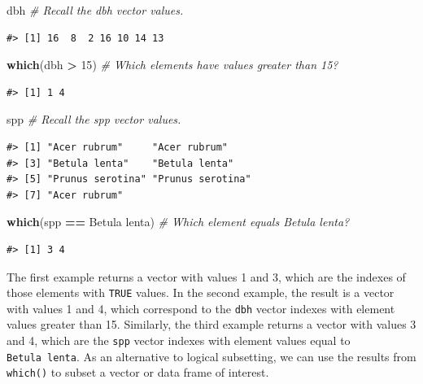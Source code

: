 \documentclass[
  11pt,
]{krantz}
\newenvironment{Shaded}{\begin{snugshade}}{\end{snugshade}}
\newcommand{\CommentTok}[1]{\textcolor[rgb]{0.56,0.35,0.01}{\textit{#1}}}
\newcommand{\DecValTok}[1]{\textcolor[rgb]{0.00,0.00,0.81}{#1}}
\newcommand{\KeywordTok}[1]{\textcolor[rgb]{0.13,0.29,0.53}{\textbf{#1}}}
\newcommand{\NormalTok}[1]{#1}
\newcommand{\OperatorTok}[1]{\textcolor[rgb]{0.81,0.36,0.00}{\textbf{#1}}}
\newcommand{\StringTok}[1]{\textcolor[rgb]{0.31,0.60,0.02}{#1}}
\theoremstyle{definition}
\theoremstyle{definition}
\theoremstyle{definition}
\theoremstyle{definition}
\theoremstyle{remark}
\begin{document}
\begin{Shaded}
\begin{Highlighting}[]
\NormalTok{dbh }\CommentTok{\# Recall the dbh vector values.}
\end{Highlighting}
\end{Shaded}

\begin{verbatim}
#> [1] 16  8  2 16 10 14 13
\end{verbatim}

\begin{Shaded}
\begin{Highlighting}[]
\KeywordTok{which}\NormalTok{(dbh }\OperatorTok{\textgreater{}}\StringTok{ }\DecValTok{15}\NormalTok{) }\CommentTok{\# Which elements have values greater than 15?}
\end{Highlighting}
\end{Shaded}

\begin{verbatim}
#> [1] 1 4
\end{verbatim}

\begin{Shaded}
\begin{Highlighting}[]
\NormalTok{spp }\CommentTok{\# Recall the spp vector values.}
\end{Highlighting}
\end{Shaded}

\begin{verbatim}
#> [1] "Acer rubrum"     "Acer rubrum"    
#> [3] "Betula lenta"    "Betula lenta"   
#> [5] "Prunus serotina" "Prunus serotina"
#> [7] "Acer rubrum"
\end{verbatim}

\begin{Shaded}
\begin{Highlighting}[]
\KeywordTok{which}\NormalTok{(spp }\OperatorTok{==}\StringTok{ \textquotesingle{}Betula lenta\textquotesingle{}}\NormalTok{) }\CommentTok{\# Which element equals Betula lenta?}
\end{Highlighting}
\end{Shaded}

\begin{verbatim}
#> [1] 3 4
\end{verbatim}

The first example returns a vector with values 1 and 3, which are the indexes of those elements with \texttt{TRUE} values. In the second example, the result is a vector with values 1 and 4, which correspond to the \texttt{dbh} vector indexes with element values greater than 15. Similarly, the third example returns a vector with values 3 and 4, which are the \texttt{spp} vector indexes with element values equal to \texttt{Betula\ lenta}. As an alternative to logical subsetting, we can use the results from \texttt{which()} to subset a vector or data frame of interest.
\end{document}

